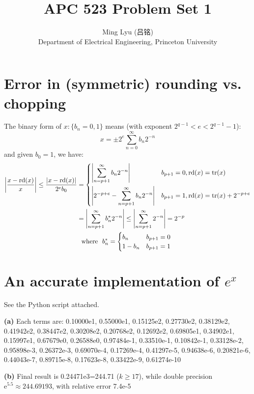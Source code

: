 \documentclass[11pt]{article}
\numberwithin{equation}{section} %
\newcommand\e{\mathrm{e}}
\DeclareMathOperator{\rd}{rd}
\DeclareMathOperator{\tr}{tr}
\begin{document}
\title{APC 523 Problem Set 1}
\author{Ming Lyu (吕铭)\\
  {\footnotesize Department of Electrical Engineering, Princeton University}
}
\maketitle
\section{Error in (symmetric) rounding vs. chopping}
The binary form of $x: \{b_n = 0, 1\}$ means
(with exponent $2^{q-1} < e < 2^{q-1}-1$):
\begin{equation}
  x = \pm 2^{e} \sum_{n=0}^\infty b_n 2^{-n}
\end{equation}
and given $b_0=1$, we have: 
\begin{align}
  \left|\frac{x - \rd (x)}{x}\right| 
  \le \frac{|x - \rd(x)|}{2^e b_0} 
  & = \begin{dcases}
    \left|\sum_{n=p+1}^{\infty} b_n 2^{-n}\right| & 
      b_{p+1} = 0, \rd(x) = \tr (x)\\
    \left|2^{-p+e} - \sum_{n=p+1}^{\infty} b_n 2^{-n}\right| & 
    b_{p+1} = 1, \rd(x) = \tr (x) + 2^{-p+e}
  \end{dcases} \\
  & = \left|\sum_{n=p+1}^\infty b_n^* 2^{-n} \right| 
  \le \left|\sum_{n=p+1}^\infty 2^{-n}\right| = 2^{-p} \\
  & \mbox{~~where~~} b_n^* = \begin{cases}
    b_n & b_{p+1} = 0 \\
    1-b_n & b_{p+1} = 1
  \end{cases}
\end{align}

\section{An accurate implementation of $e^x$}
See the Python script attached. 

\textbf{(a)} Each terms are: 
0.10000e1, 0.55000e1, 0.15125e2, 0.27730e2, 0.38129e2, 0.41942e2, 0.38447e2,
0.30208e2, 0.20768e2, 0.12692e2, 0.69805e1, 0.34902e1, 0.15997e1, 0.67679e0,
0.26588e0, 0.97484e-1, 0.33510e-1, 0.10842e-1, 0.33128e-2, 0.95898e-3,
0.26372e-3, 0.69070e-4, 0.17269e-4, 0.41297e-5, 0.94638e-6, 0.20821e-6,
0.44043e-7, 0.89715e-8, 0.17623e-8, 0.33422e-9, 0.61274e-10

\textbf{(b)} Final result is 0.24471e3=244.71 ($k\ge 17$),
while double precision $\e^{5.5} \approx 244.69193$,
with relative error 7.4e-5
\end{document}
